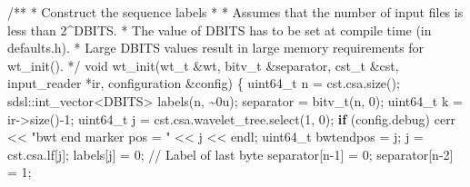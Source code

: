 \documentclass[
]{article}
\newenvironment{Shaded}{\begin{snugshade}}{\end{snugshade}}
\newcommand{\BuiltInTok}[1]{\textcolor[rgb]{0.50,0.55,0.55}{#1}}
\newcommand{\CommentTok}[1]{\textcolor[rgb]{0.48,0.49,0.49}{#1}}
\newcommand{\ControlFlowTok}[1]{\textcolor[rgb]{0.99,0.74,0.29}{\textbf{#1}}}
\newcommand{\DataTypeTok}[1]{\textcolor[rgb]{0.16,0.50,0.73}{#1}}
\newcommand{\DecValTok}[1]{\textcolor[rgb]{0.96,0.45,0.00}{#1}}
\newcommand{\NormalTok}[1]{\textcolor[rgb]{0.81,0.81,0.76}{#1}}
\newcommand{\OperatorTok}[1]{\textcolor[rgb]{0.81,0.81,0.76}{#1}}
\newcommand{\StringTok}[1]{\textcolor[rgb]{0.96,0.31,0.31}{#1}}
\begin{document}
\begin{Shaded}
\begin{Highlighting}[]
\CommentTok{/**}
\CommentTok{ * Construct the sequence labels}
\CommentTok{ *}
\CommentTok{ * Assumes that the number of input files is less than 2\^{}DBITS.}
\CommentTok{ * The value of DBITS has to be set at compile time (in defaults.h).}
\CommentTok{ * Large DBITS values result in large memory requirements for wt\_init().}
\CommentTok{ */}
\DataTypeTok{void}\NormalTok{ wt\_init}\OperatorTok{(}\NormalTok{wt\_t }\OperatorTok{\&}\NormalTok{wt}\OperatorTok{,}\NormalTok{ bitv\_t }\OperatorTok{\&}\NormalTok{separator}\OperatorTok{,}\NormalTok{ cst\_t }\OperatorTok{\&}\NormalTok{cst}\OperatorTok{,}\NormalTok{ input\_reader }\OperatorTok{*}\NormalTok{ir}\OperatorTok{,}\NormalTok{ configuration }\OperatorTok{\&}\NormalTok{config}\OperatorTok{)}
\OperatorTok{\{}
    \DataTypeTok{uint64\_t}\NormalTok{ n }\OperatorTok{=}\NormalTok{ cst}\OperatorTok{.}\NormalTok{csa}\OperatorTok{.}\NormalTok{size}\OperatorTok{();}
\NormalTok{    sdsl}\OperatorTok{::}\NormalTok{int\_vector}\OperatorTok{\textless{}}\NormalTok{DBITS}\OperatorTok{\textgreater{}}\NormalTok{ labels}\OperatorTok{(}\NormalTok{n}\OperatorTok{,} \OperatorTok{\textasciitilde{}}\DecValTok{0}\BuiltInTok{u}\OperatorTok{);}
\NormalTok{    separator }\OperatorTok{=}\NormalTok{ bitv\_t}\OperatorTok{(}\NormalTok{n}\OperatorTok{,} \DecValTok{0}\OperatorTok{);}
    \DataTypeTok{uint64\_t}\NormalTok{ k }\OperatorTok{=}\NormalTok{ ir}\OperatorTok{{-}\textgreater{}}\NormalTok{size}\OperatorTok{(){-}}\DecValTok{1}\OperatorTok{;}
    \DataTypeTok{uint64\_t}\NormalTok{ j }\OperatorTok{=}\NormalTok{ cst}\OperatorTok{.}\NormalTok{csa}\OperatorTok{.}\NormalTok{wavelet\_tree}\OperatorTok{.}\NormalTok{select}\OperatorTok{(}\DecValTok{1}\OperatorTok{,} \DecValTok{0}\OperatorTok{);}
    \ControlFlowTok{if} \OperatorTok{(}\NormalTok{config}\OperatorTok{.}\NormalTok{debug}\OperatorTok{)}
\NormalTok{        cerr }\OperatorTok{\textless{}\textless{}} \StringTok{"bwt end marker pos = "} \OperatorTok{\textless{}\textless{}}\NormalTok{ j }\OperatorTok{\textless{}\textless{}}\NormalTok{ endl}\OperatorTok{;}
    \DataTypeTok{uint64\_t}\NormalTok{ bwtendpos }\OperatorTok{=}\NormalTok{ j}\OperatorTok{;}
\NormalTok{    j }\OperatorTok{=}\NormalTok{ cst}\OperatorTok{.}\NormalTok{csa}\OperatorTok{.}\NormalTok{lf}\OperatorTok{[}\NormalTok{j}\OperatorTok{];}
\NormalTok{    labels}\OperatorTok{[}\NormalTok{j}\OperatorTok{]} \OperatorTok{=} \DecValTok{0}\OperatorTok{;}  \CommentTok{// Label of last byte}
\NormalTok{    separator}\OperatorTok{[}\NormalTok{n}\OperatorTok{{-}}\DecValTok{1}\OperatorTok{]} \OperatorTok{=} \DecValTok{0}\OperatorTok{;}
\NormalTok{    separator}\OperatorTok{[}\NormalTok{n}\OperatorTok{{-}}\DecValTok{2}\OperatorTok{]} \OperatorTok{=} \DecValTok{1}\OperatorTok{;}

\end{Highlighting}
\end{Shaded}
\end{document}
